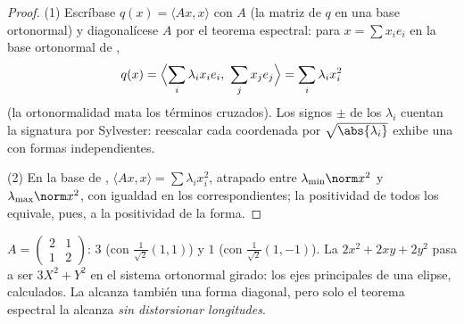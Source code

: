 \begin{proof}
(1) Escríbase $q(x) = \langle A x, x\rangle$ con $A$  (la
matriz de $q$ en una base ortonormal) y diagonalícese $A$ por el
teorema espectral: para $x = \sum x_ie_i$ en la base ortonormal de
,
\[
q(x) = \Bigl\langle \sum_i \lambda_ix_ie_i,\ \sum_j
x_je_j\Bigr\rangle = \sum_i \lambda_i x_i^2
\]
(la ortonormalidad mata los términos cruzados). Los signos $\pm$ de
los $\lambda_i$ cuentan la signatura por Sylvester: reescalar cada
coordenada por $\sqrt{\abs{\lambda_i}}$ exhibe una
 con formas independientes.

(2) En la base de , $\langle Ax, x\rangle = \sum
\lambda_i x_i^2$, atrapado entre $\lambda_{\min}\norm x^2$ y
$\lambda_{\max}\norm x^2$, con igualdad en los 
correspondientes; la positividad de todos los 
equivale, pues, a la positividad de la forma.
\end{proof}

\begin{example}\label{ex:b2:quadratic:spectralexample}
$A = \begin{pmatrix} 2 & 1\\ 1 & 2 \end{pmatrix}$: 
$3$ (con  $\frac{1}{\sqrt2}(1,1)$) y $1$ (con
$\frac{1}{\sqrt2}(1,-1)$). La  $2x^2 + 2xy + 2y^2$
pasa a ser $3X^2 + Y^2$ en el sistema ortonormal girado: los ejes
principales de una elipse, calculados. La 
alcanza también una forma diagonal, pero solo el teorema espectral
la alcanza \emph{sin distorsionar longitudes}.
\end{example}


